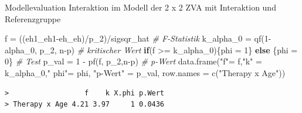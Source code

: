 \documentclass[
  8pt,
  ignorenonframetext,
]{beamer}
\newenvironment{Shaded}{\begin{snugshade}}{\end{snugshade}}
\newcommand{\AttributeTok}[1]{\textcolor[rgb]{0.77,0.63,0.00}{#1}}
\newcommand{\CommentTok}[1]{\textcolor[rgb]{0.56,0.35,0.01}{\textit{#1}}}
\newcommand{\ControlFlowTok}[1]{\textcolor[rgb]{0.13,0.29,0.53}{\textbf{#1}}}
\newcommand{\DecValTok}[1]{\textcolor[rgb]{0.00,0.00,0.81}{#1}}
\newcommand{\FunctionTok}[1]{\textcolor[rgb]{0.00,0.00,0.00}{#1}}
\newcommand{\NormalTok}[1]{#1}
\newcommand{\OtherTok}[1]{\textcolor[rgb]{0.56,0.35,0.01}{#1}}
\newcommand{\SpecialCharTok}[1]{\textcolor[rgb]{0.00,0.00,0.00}{#1}}
\newcommand{\StringTok}[1]{\textcolor[rgb]{0.31,0.60,0.02}{#1}}
\begin{document}
\begin{frame}[fragile]{\small Modellevaluation \textbar{} Interaktion im
Modell der 2 x 2 ZVA mit Interaktion und Referenzgruppe}
\begin{Shaded}
\begin{Highlighting}[]
\NormalTok{f          }\OtherTok{=}\NormalTok{ ((eh1\_eh1}\SpecialCharTok{{-}}\NormalTok{eh\_eh)}\SpecialCharTok{/}\NormalTok{p\_2)}\SpecialCharTok{/}\NormalTok{sigsqr\_hat            }\CommentTok{\# F{-}Statistik}
\NormalTok{k\_alpha\_0  }\OtherTok{=} \FunctionTok{qf}\NormalTok{(}\DecValTok{1}\SpecialCharTok{{-}}\NormalTok{alpha\_0, p\_2, n}\SpecialCharTok{{-}}\NormalTok{p)                     }\CommentTok{\# kritischer Wert}
\ControlFlowTok{if}\NormalTok{(f }\SpecialCharTok{\textgreater{}=}\NormalTok{ k\_alpha\_0)\{phi }\OtherTok{=} \DecValTok{1}\NormalTok{\} }\ControlFlowTok{else}\NormalTok{ \{phi }\OtherTok{=} \DecValTok{0}\NormalTok{\}               }\CommentTok{\# Test}
\NormalTok{p\_val      }\OtherTok{=} \DecValTok{1} \SpecialCharTok{{-}} \FunctionTok{pf}\NormalTok{(f, p\_2,n}\SpecialCharTok{{-}}\NormalTok{p)                          }\CommentTok{\# p{-}Wert}
\FunctionTok{data.frame}\NormalTok{(}\StringTok{"f"}\OtherTok{=}\NormalTok{ f,}\StringTok{"k"} \OtherTok{=}\NormalTok{ k\_alpha\_0,}\StringTok{" phi"}\OtherTok{=}\NormalTok{ phi, }\StringTok{"p{-}Wert"} \OtherTok{=}\NormalTok{ p\_val, }\AttributeTok{row.names =} \FunctionTok{c}\NormalTok{(}\StringTok{"Therapy x Age"}\NormalTok{))}
\end{Highlighting}
\end{Shaded}

\begin{verbatim}
>                  f    k X.phi p.Wert
> Therapy x Age 4.21 3.97     1 0.0436
\end{verbatim}
\end{frame}
\end{document}
